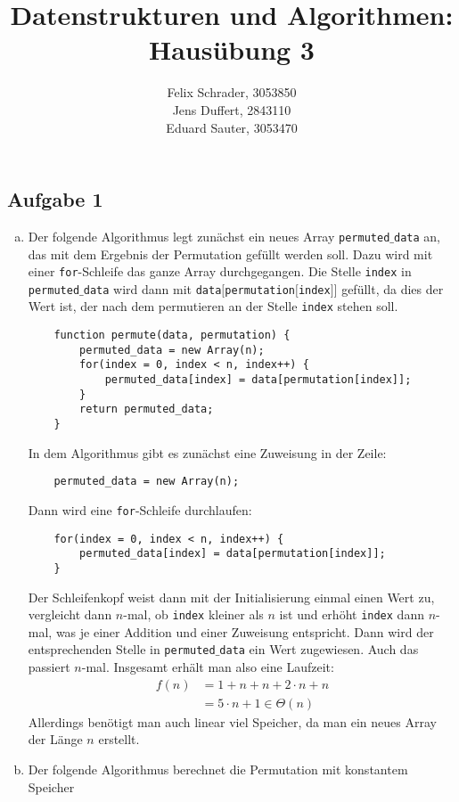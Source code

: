 \documentclass[11pt]{article}
\author{
  Felix Schrader, 3053850 \\ 
  Jens Duffert, 2843110 \\
  Eduard Sauter, 3053470
}
\title{Datenstrukturen und Algorithmen: Haus\"ubung 3}
\begin{document}
\maketitle
\subsection*{Aufgabe 1}
\begin{enumerate}[a)]
\item
  Der folgende Algorithmus legt zunächst ein neues Array
  \texttt{permuted$\_$data} an, das mit dem Ergebnis der Permutation gefüllt
  werden soll. Dazu wird mit einer \texttt{for}-Schleife das ganze Array
  durchgegangen. Die Stelle \texttt{index} in \texttt{permuted$\_$data} wird
  dann mit \texttt{data$\lbrack$permutation$\lbrack$index$\rbrack\rbrack$}
  gefüllt, da dies der Wert ist, der nach dem permutieren an der Stelle
  \texttt{index} stehen soll.
  \begin{lstlisting}
    function permute(data, permutation) {
        permuted_data = new Array(n);
        for(index = 0, index < n, index++) {
            permuted_data[index] = data[permutation[index]];
        }
        return permuted_data;
    }
  \end{lstlisting}
  In dem Algorithmus gibt es zunächst eine Zuweisung in der Zeile:
  \begin{lstlisting}
    permuted_data = new Array(n);
  \end{lstlisting}
  Dann wird eine \texttt{for}-Schleife durchlaufen:
  \begin{lstlisting}
    for(index = 0, index < n, index++) {
        permuted_data[index] = data[permutation[index]];
    }
  \end{lstlisting}
  Der Schleifenkopf weist dann mit der Initialisierung einmal einen Wert zu,
  vergleicht dann $n$-mal, ob \texttt{index} kleiner als $n$ ist und erhöht
  \texttt{index} dann $n$-mal, was je einer Addition und einer Zuweisung
  entspricht. Dann wird der entsprechenden Stelle in \texttt{permuted$\_$data}
  ein Wert zugewiesen. Auch das passiert $n$-mal. Insgesamt erhält man also
  eine Laufzeit:
  \begin{align*}
    f (n) &= 1 + n + n + 2 \cdot n + n
    \\ &= 5 \cdot n + 1 \in \Theta (n)
  \end{align*}
  Allerdings benötigt man auch linear viel Speicher, da man ein neues Array der
  Länge $n$ erstellt.
\item
  Der folgende Algorithmus berechnet die Permutation mit konstantem Speicher

\end{enumerate}
\end{document}

